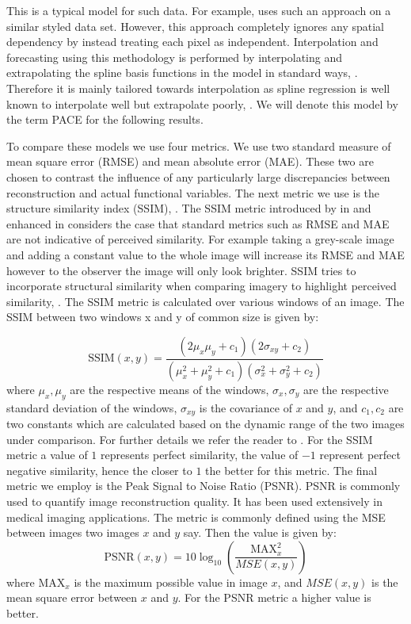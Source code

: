 This is a typical model for such data.
For example, \cite{hooker_maximal_2016} uses such an approach on a similar styled data set. 
However, this approach completely ignores any spatial dependency by instead treating each pixel as independent.
Interpolation and forecasting using this methodology is performed by interpolating and extrapolating the spline basis functions in the model in standard ways, \citep{de_boor_practical_2001}.
Therefore it is mainly tailored towards interpolation as spline regression is well known to interpolate well but extrapolate poorly, \citep{de_boor_practical_2001}.
We will denote this model by the term PACE for the following results. 


To compare these models we use four metrics. 
We use two standard measure of mean square error (RMSE) and mean absolute error (MAE).
These two are chosen to contrast the influence of any particularly large discrepancies between reconstruction and actual functional variables. 
The next metric we use is the structure similarity index (SSIM), \citep{wang_image_2004}.
The SSIM metric introduced by \citeauthor{wang_image_2004} in \citeyear{wang_image_2004} and enhanced in \citeyear{wang_mean_2009} considers the case that standard metrics such as RMSE and MAE are not indicative of perceived similarity.
For example taking a grey-scale image and adding a constant value to the whole image will increase its RMSE and MAE however to the observer the image will only look brighter. 
SSIM tries to incorporate structural similarity when comparing imagery to highlight perceived similarity, \citep{wang_mean_2009}. 
The SSIM metric is calculated over various windows of an image.
The SSIM between two windows x and y of common size is given by:

\begin{equation}
	\text{SSIM}\left(x, y\right) = \frac{(2 \mu_x \mu_y + c_1)(2\sigma_{xy} + c_2)}{(\mu_x^2 + \mu_y^2 + c_1)(\sigma_x^2 + \sigma_y^2 + c_2)}
\end{equation}
where $\mu_x, \mu_y$ are the respective means of the windows, $\sigma_x, \sigma_y$ are the respective standard deviation of the windows, $\sigma_{xy}$ is the covariance of $x$ and $y$, and $c_1, c_2$ are two constants which are calculated based on the dynamic range of the two images under comparison.
For further details we refer the reader to \citep{wang_mean_2009}.
For the SSIM metric a value of $1$ represents perfect similarity, the value of $-1$ represent perfect negative similarity, hence the closer to $1$ the better for this metric.
The final metric we employ is the Peak Signal to Noise Ratio (PSNR). 
PSNR is commonly used to quantify image reconstruction quality. 
It has been used extensively in medical imaging applications.
The metric is commonly defined using the MSE between images two images $x$ and $y$ say.
Then the value is given by:
\begin{equation}
	\text{PSNR}(x, y) = 10 \log_{10}\left(\frac{\text{MAX}^2_x}{MSE(x,y)}\right)
\end{equation}
where $\text{MAX}_x$ is the maximum possible value in image $x$, and $MSE(x,y)$ is the mean square error between $x$ and $y$.  
For the PSNR metric a higher value is better. 

